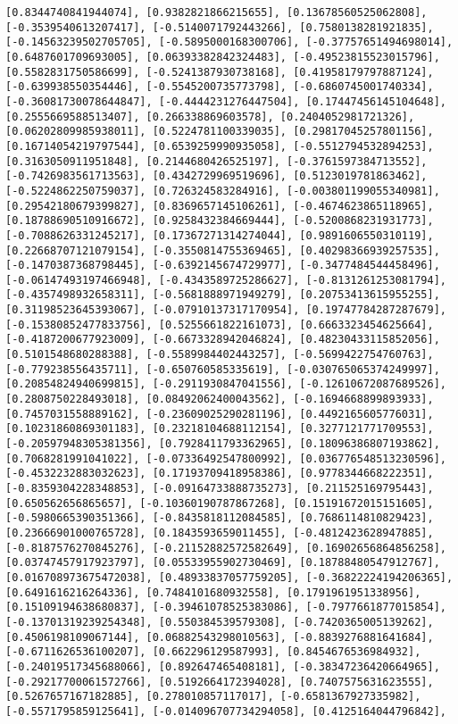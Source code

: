 \documentclass[11pt]{article}
\begin{document}
\begin{Verbatim}[commandchars=\\\{\}]
[0.8344740841944074], [0.9382821866215655], [0.13678560525062808], [-0.3539540613207417], [-0.5140071792443266], [0.7580138281921835], [-0.14563239502705705], [-0.5895000168300706], [-0.37757651494698014], [0.6487601709693005], [0.06393382842324483], [-0.49523815523015796], [0.5582831750586699], [-0.5241387930738168], [0.41958179797887124], [-0.639938550354446], [-0.5545200735773798], [-0.6860745001740334], [-0.36081730078644847], [-0.4444231276447504], [0.17447456145104648], [0.2555669588513407], [0.266338869603578], [0.2404052981721326], [0.06202809985938011], [0.5224781100339035], [0.29817045257801156], [0.16714054219797544], [0.6539259990935058], [-0.5512794532894253], [0.3163050911951848], [0.2144680426525197], [-0.3761597384713552], [-0.7426983561713563], [0.4342729969519696], [0.5123019781863462], [-0.5224862250759037], [0.726324583284916], [-0.003801199055340981], [0.29542180679399827], [0.8369657145106261], [-0.4674623865118965], [0.18788690510916672], [0.9258432384669444], [-0.5200868231931773], [-0.7088626331245217], [0.17367271314274044], [0.9891606550310119], [0.22668707121079154], [-0.3550814755369465], [0.40298366939257535], [-0.1470387368798445], [-0.6392145674729977], [-0.3477484544458496], [-0.06147493197466948], [-0.4343589725286627], [-0.8131261253081794], [-0.4357498932658311], [-0.5681888971949279], [0.20753413615955255], [0.31198523645393067], [-0.07910137317170954], [0.19747784287287679], [-0.15380852477833756], [0.5255661822161073], [0.6663323454625664], [-0.4187200677923009], [-0.6673328942046824], [0.48230433115852056], [0.5101548680288388], [-0.5589984402443257], [-0.5699422754760763], [-0.779238556435711], [-0.650760585335619], [-0.030765065374249997], [0.20854824940699815], [-0.2911930847041556], [-0.12610672087689526], [0.2808750228493018], [0.08492062400043562], [-0.1694668899893933], [0.7457031558889162], [-0.23609025290281196], [0.4492165605776031], [0.10231860869301183], [0.23218104688112154], [0.3277121771709553], [-0.20597948305381356], [0.7928411793362965], [0.18096386807193862], [0.7068281991041022], [-0.07336492547800992], [0.036776548513230596], [-0.4532232883032623], [0.17193709418958386], [0.9778344668222351], [-0.8359304228348853], [-0.09164733888735273], [0.211525169795443], [0.650562656865657], [-0.10360190787867268], [0.15191672015151605], [-0.5980665390351366], [-0.8435818112084585], [0.7686114810829423], [0.23666901000765728], [0.1843593659011455], [-0.4812423628947885], [-0.8187576270845276], [-0.21152882572582649], [0.16902656864856258], [0.03747457917923797], [0.05533955902730469], [0.18788480547912767], [0.016708973675472038], [0.48933837057759205], [-0.36822224194206365], [0.6491616216264336], [0.7484101680932558], [0.1791961951338956], [0.15109194638680837], [-0.39461078525383086], [-0.7977661877015854], [-0.13701319239254348], [0.550384539579308], [-0.7420365005139262], [0.4506198109067144], [0.06882543298010563], [-0.8839276881641684], [-0.6711626536100207], [0.662296129587993], [0.8454676536984932], [-0.24019517345688066], [0.892647465408181], [-0.38347236420664965], [-0.29217700061572766], [0.5192664172394028], [0.7407575631623555], [0.5267657167182885], [0.278010857117017], [-0.6581367927335982], [-0.5571795859125641], [-0.014096707734294058], [0.4125164044796842], 
\end{Verbatim}
\end{document}
